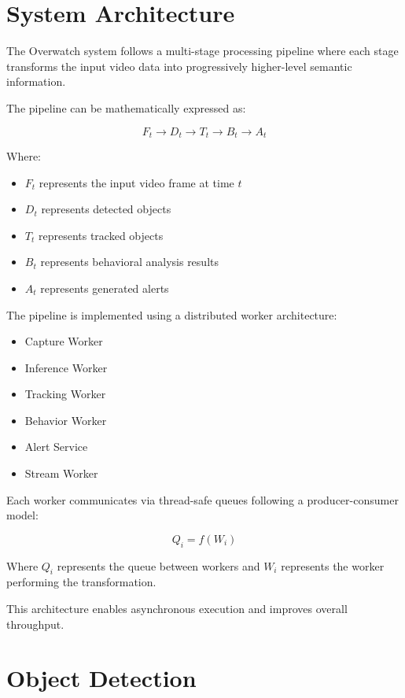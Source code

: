 \documentclass[conference]{IEEEtran}
\begin{document}
\section{System Architecture}

The Overwatch system follows a multi-stage processing pipeline where each stage transforms the input video data into progressively higher-level semantic information.

The pipeline can be mathematically expressed as:

\begin{equation}
F_t \rightarrow D_t \rightarrow T_t \rightarrow B_t \rightarrow A_t
\end{equation}

Where:

\begin{itemize}
\item $F_t$ represents the input video frame at time $t$
\item $D_t$ represents detected objects
\item $T_t$ represents tracked objects
\item $B_t$ represents behavioral analysis results
\item $A_t$ represents generated alerts
\end{itemize}

The pipeline is implemented using a distributed worker architecture:

\begin{itemize}
\item Capture Worker
\item Inference Worker
\item Tracking Worker
\item Behavior Worker
\item Alert Service
\item Stream Worker
\end{itemize}

Each worker communicates via thread-safe queues following a producer-consumer model:

\begin{equation}
Q_i = f(W_i)
\end{equation}

Where $Q_i$ represents the queue between workers and $W_i$ represents the worker performing the transformation.

This architecture enables asynchronous execution and improves overall throughput.

\section{Object Detection}
\end{document}
